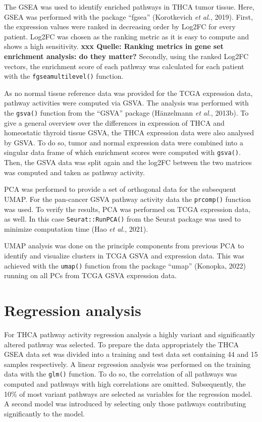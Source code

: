 \documentclass[
  parskip,
  oneside]{scrreprt}
\begin{document}
The GSEA was used to identify enriched pathways in THCA tumor tissue.
Here, GSEA was performed with the package ``fgsea'' (Korotkevich
\emph{et al.}, 2019). First, the expression values were ranked in
decreasing order by Log2FC for every patient. Log2FC was chosen as the
ranking metric as it is easy to compute and shows a high sensitivity.
\textbf{xxx Quelle: Ranking metrics in gene set enrichment analysis: do
they matter?} Secondly, using the ranked Log2FC vectors, the enrichment
score of each pathway was calculated for each patient with the
\texttt{fgseamultilevel()} function.

As no normal tissue reference data was provided for the TCGA expression
data, pathway activities were computed via GSVA. The analysis was
performed with the \texttt{gsva()} function from the ``GSVA'' package
(Hänzelmann \emph{et al.}, 2013b). To give a general overview over the
differences in expression of THCA and homeostatic thyroid tissue GSVA,
the THCA expression data were also analysed by GSVA. To do so, tumor and
normal expression data were combined into a singular data frame of which
enrichment scores were computed with \texttt{gsva()}. Then, the GSVA
data was split again and the log2FC between the two matrices was
computed and taken as pathway activity.

PCA was performed to provide a set of orthogonal data for the subsequent
UMAP. For the pan-cancer GSVA pathway activity data the
\texttt{prcomp()} function was used. To verify the results, PCA was
performed on TCGA expression data, as well. In this case
\texttt{Seurat::RunPCA()} from the Seurat package was used to minimize
computation time (Hao \emph{et al.}, 2021).

UMAP analysis was done on the principle components from previous PCA to
identify and visualize clusters in TCGA GSVA and expression data. This
was achieved with the \texttt{umap()} function from the package ``umap''
(Konopka, 2022) running on all PCs from TCGA GSVA expression data.

\hypertarget{regression-analysis}{%
\section{Regression analysis}\label{regression-analysis}}

For THCA pathway activity regression analysis a highly variant and
significantly altered pathway was selected. To prepare the data
appropriately the THCA GSEA data set was divided into a training and
test data set containing 44 and 15 samples respectively. A linear
regression analysis was performed on the training data with the
\texttt{glm()} function. To do so, the correlation of all pathways was
computed and pathways with high correlations are omitted. Subsequently,
the 10\% of most variant pathways are selected as variables for the
regression model. A second model was introduced by selecting only those
pathways contributing significantly to the model.
\end{document}

